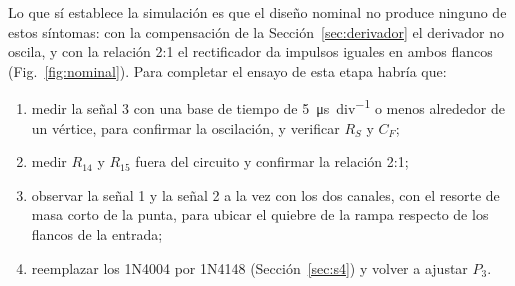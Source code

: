 Lo que sí establece la simulación es que el diseño nominal no produce ninguno de estos síntomas: con la compensación de la Sección~\ref{sec:derivador} el derivador no oscila, y con la relación 2:1 el rectificador da impulsos iguales en ambos flancos (Fig.~\ref{fig:nominal}). Para completar el ensayo de esta etapa habría que:
\begin{enumerate}[leftmargin=*, nosep]
    \item medir la señal 3 con una base de tiempo de \SI{5}{\micro\second\per div} o menos alrededor de un vértice, para confirmar la oscilación, y verificar $R_S$ y $C_F$;
    \item medir $R_{14}$ y $R_{15}$ fuera del circuito y confirmar la relación 2:1;
    \item observar la señal 1 y la señal 2 a la vez con los dos canales, con el resorte de masa corto de la punta, para ubicar el quiebre de la rampa respecto de los flancos de la entrada;
    \item reemplazar los 1N4004 por 1N4148 (Sección~\ref{sec:s4}) y volver a ajustar $P_3$.
\end{enumerate}
